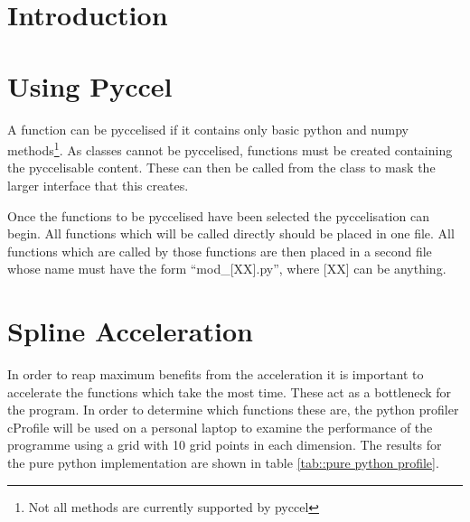 
\section{Introduction}



\section{Using Pyccel}

A function can be pyccelised if it contains only basic python and numpy methods\footnote{Not all methods are currently supported by pyccel}. As classes cannot be pyccelised, functions must be created containing the pyccelisable content. These can then be called from the class to mask the larger interface that this creates.

Once the functions to be pyccelised have been selected the pyccelisation can begin. All functions which will be called directly should be placed in one file. All functions which are called by those functions are then placed in a second file whose name must have the form ``mod\_[XX].py'', where [XX] can be anything. 

\section{Spline Acceleration}

In order to reap maximum benefits from the acceleration it is important to accelerate the functions which take the most time. These act as a bottleneck for the program. In order to determine which functions these are, the python profiler cProfile will be used on a personal laptop to examine the performance of the programme using a grid with 10 grid points in each dimension. The results for the pure python implementation are shown in table \ref{tab::pure python profile}.

